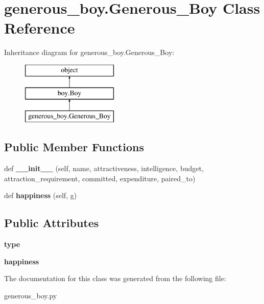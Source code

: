 \hypertarget{classgenerous__boy_1_1_generous___boy}{}\section{generous\+\_\+boy.\+Generous\+\_\+\+Boy Class Reference}
\label{classgenerous__boy_1_1_generous___boy}
Inheritance diagram for generous\+\_\+boy.\+Generous\+\_\+\+Boy\+:\begin{figure}[H]
\begin{center}
\leavevmode
\includegraphics[height=3.000000cm]{classgenerous__boy_1_1_generous___boy}
\end{center}
\end{figure}
\subsection*{Public Member Functions}
\begin{DoxyCompactItemize}
\item 
\mbox{\label{classgenerous__boy_1_1_generous___boy_a0b255a2a43d52138254fb384eeb8ca4b}} 
def {\bfseries \+\_\+\+\_\+init\+\_\+\+\_\+} (self, name, attractiveness, intelligence, budget, attraction\+\_\+requirement, committed, expenditure, paired\+\_\+to)
\item 
\mbox{\label{classgenerous__boy_1_1_generous___boy_a0fe95bfe65726fcffdf859b0ae03932f}} 
def {\bfseries happiness} (self, g)
\end{DoxyCompactItemize}
\subsection*{Public Attributes}
\begin{DoxyCompactItemize}
\item 
\mbox{\label{classgenerous__boy_1_1_generous___boy_a23cec95ad272bb25b7b3be28e07fff43}} 
{\bfseries type}
\item 
\mbox{\label{classgenerous__boy_1_1_generous___boy_a7461b9bcdb7f0531e3cd9ba2b48aa535}} 
{\bfseries happiness}
\end{DoxyCompactItemize}


The documentation for this class was generated from the following file\+:\begin{DoxyCompactItemize}
\item 
generous\+\_\+boy.\+py\end{DoxyCompactItemize}
